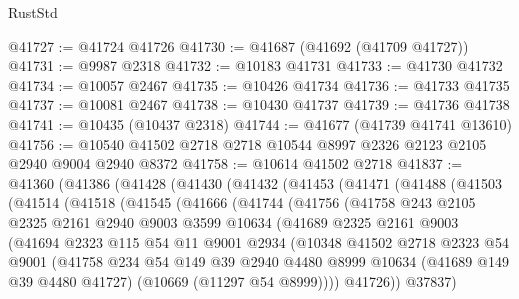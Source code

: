 \begin{lexlean}{RustStd}
\begin{coremodule}
@41727 := @41724 @41726
@41730 := @41687 (@41692 (@41709 @41727))
@41731 := @9987 @2318
@41732 := @10183 @41731
@41733 := @41730 @41732
@41734 := @10057 @2467
@41735 := @10426 @41734
@41736 := @41733 @41735
@41737 := @10081 @2467
@41738 := @10430 @41737
@41739 := @41736 @41738
@41741 := @10435 (@10437 @2318)
@41744 := @41677 (@41739 @41741 @13610)
@41756 := @10540 @41502 @2718 @2718 @10544 @8997 @2326 @2123 @2105 @2940 @9004 @2940 @8372
@41758 := @10614 @41502 @2718
@41837 := @41360
    (@41386
      (@41428
        (@41430
          (@41432
            (@41453
              (@41471
                (@41488
                  (@41503
                    (@41514
                      (@41518
                        (@41545
                          (@41666
                            (@41744
                              (@41756
                                (@41758
                                  @243
                                  @2105
                                  @2325
                                  @2161
                                  @2940
                                  @9003
                                  @3599
                                  @10634
                                  (@41689
                                    @2325
                                    @2161
                                    @9003
                                    (@41694
                                      @2323
                                      @115
                                      @54
                                      @11
                                      @9001
                                      @2934
                                      (@10348
                                        @41502
                                        @2718
                                        @2323
                                        @54
                                        @9001
                                        (@41758
                                          @234
                                          @54
                                          @149
                                          @39
                                          @2940
                                          @4480
                                          @8999
                                          @10634
                                          (@41689 @149 @39 @4480 @41727)
                                          (@10669 (@11297 @54 @8999))))
                                      @41726))
                                  @37837)

\end{coremodule}
\end{lexlean}
